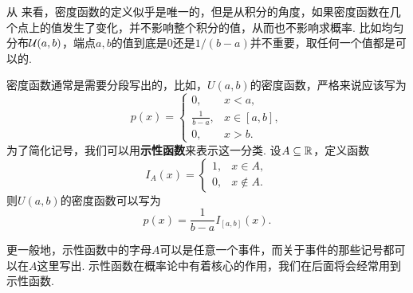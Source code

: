 \begin{table}[htbp]
\centering
{}
\caption{本书中用到的连续型分布}
\label{tab:continuous-distribution}
\end{table}

\begin{remark}
从 来看，密度函数的定义似乎是唯一的，但是从积分的角度，如果密度函数在几个点上的值发生了变化，并不影响整个积分的值，从而也不影响求概率. 比如均匀分布$\mathcal{U}(a,b)$，端点$a,b$的值到底是$0$还是$1/(b-a)$并不重要，取任何一个值都是可以的.     
\end{remark}

\begin{remark}
密度函数通常是需要分段写出的，比如，$U(a,b)$的密度函数，严格来说应该写为
\[p(x)=\begin{cases}
    0,&x<a,\\
    \frac{1}{b-a},&x\in[a,b],\\
    0,&x>b.
\end{cases}\]
为了简化记号，我们可以用\textbf{示性函数}来表示这一分类. 设$A\subseteq\mathbb{R}$，定义函数
\[I_A(x)=\begin{cases}
    1,&x\in A,\\
    0,&x\notin A.
\end{cases}\]
则$U(a,b)$的密度函数可以写为
\[p(x)=\frac{1}{b-a}I_{[a,b]}(x).\]

更一般地，示性函数中的字母$A$可以是任意一个事件，而关于事件的那些记号都可以在$A$这里写出. 示性函数在概率论中有着核心的作用，我们在后面将会经常用到示性函数. 
\end{remark}

